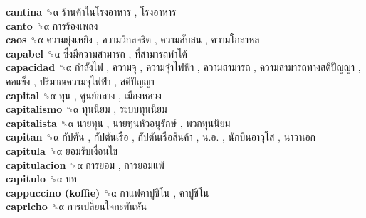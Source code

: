 \textbf{cantina} ␝α   ร้านค้าในโรงอาหาร ,  โรงอาหาร   \\
\textbf{canto} ␝α   การร้องเพลง   \\
\textbf{caos} ␝α   ความยุ่งเหยิง ,  ความวิกลจริต ,  ความสับสน ,  ความโกลาหล   \\
\textbf{capabel} ␝α   ซึ่งมีความสามารถ ,  ที่สามารถทำได้   \\
\textbf{capacidad} ␝α   กำลังไฟ ,  ความจุ ,  ความจุำไฟฟ้า ,  ความสามารถ ,  ความสามารถทางสติปัญญา ,  คอแข็ง ,  ปริมาณความจุไฟฟ้า ,  สติปัญญา   \\
\textbf{capital} ␝α   ทุน ,  ศูนย์กลาง ,  เมืองหลวง   \\
\textbf{capitalismo} ␝α   ทุนนิยม ,  ระบบทุนนิยม   \\
\textbf{capitalista} ␝α   นายทุน ,  นายทุนหัวอนุรักษ์ ,  พวกทุนนิยม   \\
\textbf{capitan} ␝α   กัปตัน ,  กัปตันเรือ ,  กัปตันเรือสินค้า ,  น.อ. ,  นักบินอาวุโส ,  นาวาเอก   \\
\textbf{capitula} ␝α   ยอมรับเงื่อนไข   \\
\textbf{capitulacion} ␝α   การยอม ,  การยอมแพ้   \\
\textbf{capitulo} ␝α   บท   \\
\textbf{cappuccino (koffie)} ␝α   กาแฟคาปูชิโน ,  คาปูชิโน   \\
\textbf{capricho} ␝α   การเปลี่ยนใจกะทันหัน   \\
